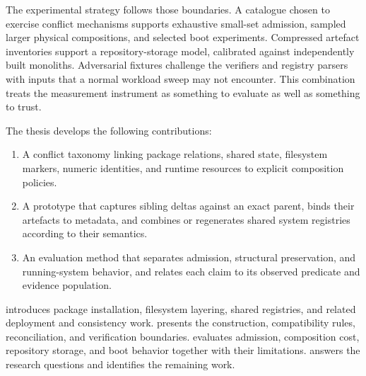 The experimental strategy follows those boundaries. A catalogue chosen to exercise conflict mechanisms supports exhaustive small-set admission, sampled larger physical compositions, and selected boot experiments. Compressed artefact inventories support a repository-storage model, calibrated against independently built monoliths. Adversarial fixtures challenge the verifiers and registry parsers with inputs that a normal workload sweep may not encounter. This combination treats the measurement instrument as something to evaluate as well as something to trust.

The thesis develops the following contributions:
\begin{enumerate}
\item A conflict taxonomy linking package relations, shared state, filesystem markers, numeric identities, and runtime resources to explicit composition policies.
\item A prototype that captures sibling deltas against an exact parent, binds their artefacts to metadata, and combines or regenerates shared system registries according to their semantics.
\item An evaluation method that separates admission, structural preservation, and running-system behavior, and relates each claim to its observed predicate and evidence population.
\end{enumerate}

 introduces package installation, filesystem layering, shared registries, and related deployment and consistency work.  presents the construction, compatibility rules, reconciliation, and verification boundaries.  evaluates admission, composition cost, repository storage, and boot behavior together with their limitations.  answers the research questions and identifies the remaining work.
